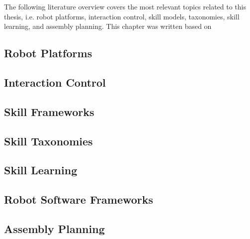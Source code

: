 The following literature overview covers the most relevant topics related to this thesis, i.e. robot platforms, interaction control, skill models, taxonomies, skill learning, and assembly planning.
This chapter was written based on \cite{Johannsmeier.2017,Johannsmeier.2019,Haddadin.2022,Johannsmeier.2023,Johannsmeier.2023b}

\subsection{Robot Platforms}\label{ch:introduction:related:platforms}


\subsection{Interaction Control}\label{ch:introduction:related:control}


\subsection{Skill Frameworks}\label{ch:introduction:related:modeling}


\subsection{Skill Taxonomies}\label{ch:introduction:related:taxonomies}


\subsection{Skill Learning}\label{ch:introduction:related:learning}


\subsection{Robot Software Frameworks}\label{ch:introduction:related:frameworks}


\subsection{Assembly Planning}\label{ch:introduction:related:assembly}
